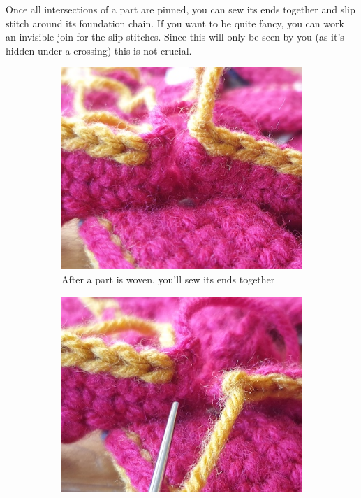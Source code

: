 \documentclass[openany]{book}
\begin{document}
Once all intersections of a part are pinned, you can sew its ends together and slip stitch around its foundation chain. If you want to be quite fancy, you can work an invisible join for the slip stitches. Since this will only be seen by you (as it's hidden under a crossing) this is not crucial.


\begin{figure}[H]\centering
\begin{subfigure}[t]{.3\textwidth}\centering
\includegraphics[width=.95\textwidth]{bk/join1}
\caption{After a part is woven, you'll sew its ends together}
\end{subfigure}
%
\begin{subfigure}[t]{.3\textwidth}
		\centering
		\includegraphics[width=.95\textwidth]{bk/join2}

\end{subfigure}
\end{figure}
\end{document}
